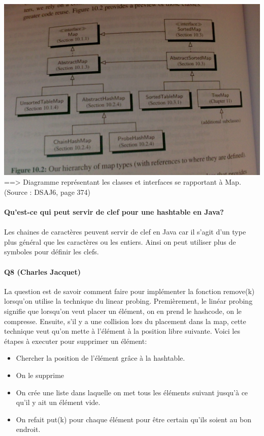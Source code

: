 \documentclass[a4paper]{article}
\begin{document}
\includegraphics[scale=0.13]{diagramme.png}
\\
==> Diagramme représentant les classes et interfaces se rapportant à Map. \\
(Source : DSAJ6, page 374)\\

\paragraph{Qu'est-ce qui peut servir de clef pour une hashtable en Java?}
\paragraph*{}
Les chaines de caractères peuvent servir de clef en Java car il s'agit d'un type plus général que les caractères ou les entiers. Ainsi on peut utiliser plus de symboles pour définir les clefs. 

\paragraph{Q8 (Charles Jacquet)}
La question est de savoir comment faire pour implémenter la fonction remove(k) lorsqu'on utilise la technique du linear probing. Premièrement, le linéar probing signifie que lorsqu'on veut placer un élément, on en prend le hashcode, on le compresse. Ensuite, s'il y a une collision lors du placement dans la map, cette technique veut qu'on mette à l'élément à la position libre suivante. Voici les étapes à executer pour supprimer un élément:
\begin{itemize}
\item Chercher la position de l'élément grâce à la hashtable.
\item On le supprime
\item On crée une liste dans laquelle on met tous les éléments suivant jusqu'à ce qu'il y ait un élément vide.
\item On refait put(k) pour chaque élément pour être certain qu'ils soient au bon endroit.
\end{itemize}
\end{document}
